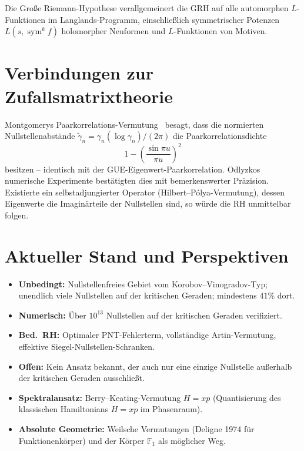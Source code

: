 \documentclass[12pt,a4paper]{article}
\theoremstyle{remark}
\begin{document}
Die Große Riemann-Hypothese verallgemeinert die GRH auf alle automorphen $L$-Funktionen
im Langlands-Programm, einschließlich symmetrischer Potenzen $L(s,\operatorname{sym}^k f)$
holomorpher Neuformen und $L$-Funktionen von Motiven.

\section{Verbindungen zur Zufallsmatrixtheorie}

Montgomerys Paarkorrelations-Vermutung~\cite{Montgomery1973} besagt, dass die normierten
Nullstellenabstände $\tilde\gamma_n = \gamma_n(\log\gamma_n)/(2\pi)$ die
Paarkorrelationsdichte
\[
  1 - \left(\frac{\sin\pi u}{\pi u}\right)^2
\]
besitzen – identisch mit der GUE-Eigenwert-Paarkorrelation.  Odlyzkos numerische Experimente
bestätigten dies mit bemerkenswerter Präzision.  Existierte ein selbstadjungierter Operator
(Hilbert--Pólya-Vermutung), dessen Eigenwerte die Imaginärteile der Nullstellen sind, so
würde die RH unmittelbar folgen.

\section{Aktueller Stand und Perspektiven}

\begin{itemize}[nosep]
  \item \textbf{Unbedingt:} Nullstellenfreies Gebiet vom Korobov--Vinogradov-Typ;
    unendlich viele Nullstellen auf der kritischen Geraden; mindestens $41\%$ dort.
  \item \textbf{Numerisch:} Über $10^{13}$ Nullstellen auf der kritischen Geraden verifiziert.
  \item \textbf{Bed.\ RH:} Optimaler PNT-Fehlerterm, vollständige Artin-Vermutung,
    effektive Siegel-Nullstellen-Schranken.
  \item \textbf{Offen:} Kein Ansatz bekannt, der auch nur eine einzige Nullstelle
    außerhalb der kritischen Geraden ausschließt.
  \item \textbf{Spektralansatz:} Berry--Keating-Vermutung $H=xp$ (Quantisierung des
    klassischen Hamiltonians $H=xp$ im Phasenraum).
  \item \textbf{Absolute Geometrie:} Weilsche Vermutungen (Deligne 1974 für Funktionenkörper)
    und der Körper $\mathbb{F}_1$ als möglicher Weg.
\end{itemize}
\end{document}
